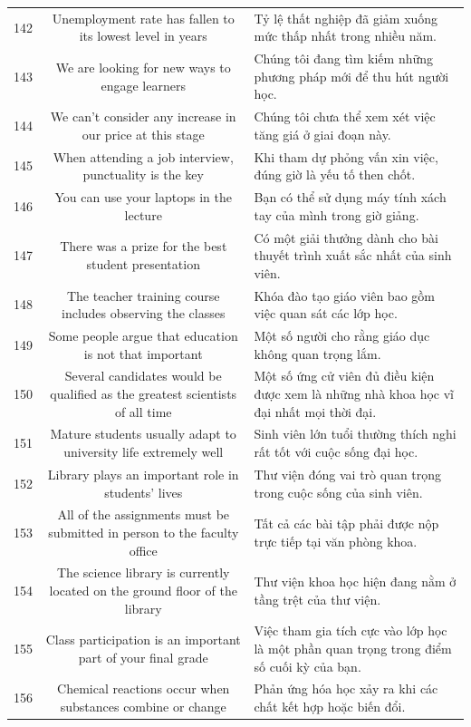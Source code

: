 \documentclass[11pt,a4paper]{article}
\begin{document}
\begin{longtable}{N S M}
142 & Unemployment rate has fallen to its lowest level in years & Tỷ lệ thất nghiệp đã giảm xuống mức thấp nhất trong nhiều năm. \\
143 & We are looking for new ways to engage learners & Chúng tôi đang tìm kiếm những phương pháp mới để thu hút người học. \\
144 & We can’t consider any increase in our price at this stage & Chúng tôi chưa thể xem xét việc tăng giá ở giai đoạn này. \\
145 & When attending a job interview, punctuality is the key & Khi tham dự phỏng vấn xin việc, đúng giờ là yếu tố then chốt. \\
146 & You can use your laptops in the lecture & Bạn có thể sử dụng máy tính xách tay của mình trong giờ giảng. \\
147 & There was a prize for the best student presentation & Có một giải thưởng dành cho bài thuyết trình xuất sắc nhất của sinh viên. \\
148 & The teacher training course includes observing the classes & Khóa đào tạo giáo viên bao gồm việc quan sát các lớp học. \\
149 & Some people argue that education is not that important & Một số người cho rằng giáo dục không quan trọng lắm. \\
150 & Several candidates would be qualified as the greatest scientists of all time & Một số ứng cử viên đủ điều kiện được xem là những nhà khoa học vĩ đại nhất mọi thời đại. \\
151 & Mature students usually adapt to university life extremely well & Sinh viên lớn tuổi thường thích nghi rất tốt với cuộc sống đại học. \\
152 & Library plays an important role in students' lives & Thư viện đóng vai trò quan trọng trong cuộc sống của sinh viên. \\
153 & All of the assignments must be submitted in person to the faculty office & Tất cả các bài tập phải được nộp trực tiếp tại văn phòng khoa. \\
154 & The science library is currently located on the ground floor of the library & Thư viện khoa học hiện đang nằm ở tầng trệt của thư viện. \\
155 & Class participation is an important part of your final grade & Việc tham gia tích cực vào lớp học là một phần quan trọng trong điểm số cuối kỳ của bạn. \\
156 & Chemical reactions occur when substances combine or change & Phản ứng hóa học xảy ra khi các chất kết hợp hoặc biến đổi. \\

\end{longtable}
\end{document}
